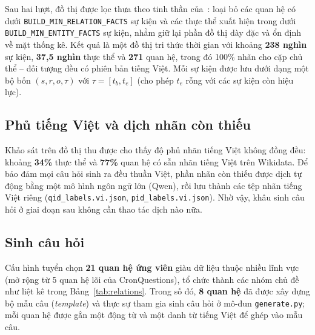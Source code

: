 Sau hai lượt, đồ thị được lọc thưa theo tinh thần của~\cite{lacroix2020tkbc}: loại bỏ các quan hệ
có dưới \texttt{BUILD\_MIN\_RELATION\_FACTS} sự kiện và các thực thể xuất hiện trong dưới
\texttt{BUILD\_MIN\_ENTITY\_FACTS} sự kiện, nhằm giữ lại phần đồ thị dày đặc và ổn định về mặt thống
kê. Kết quả là một đồ thị tri thức thời gian với khoảng \textbf{238 nghìn} sự kiện, \textbf{37,5
nghìn} thực thể và \textbf{271} quan hệ, trong đó 100\% nhãn cho cặp chủ thể -- đối tượng đều có
phiên bản tiếng Việt. Mỗi sự kiện được lưu dưới dạng một bộ bốn $(s, r, o, \tau)$ với
$\tau = [t_{b}, t_{e}]$ (cho phép $t_{e}$ rỗng với các sự kiện còn hiệu lực).

\subsection{Phủ tiếng Việt và dịch nhãn còn thiếu}
\label{sec:vicoverage}

Khảo sát trên đồ thị thu được cho thấy độ phủ nhãn tiếng Việt không đồng đều: khoảng \textbf{34\%}
thực thể và \textbf{77\%} quan hệ có sẵn nhãn tiếng Việt trên Wikidata. Để bảo đảm mọi câu hỏi sinh
ra đều thuần Việt, phần nhãn còn thiếu được dịch tự động bằng một mô hình ngôn ngữ lớn (Qwen), rồi
lưu thành các tệp nhãn tiếng Việt riêng (\texttt{qid\_labels.vi.json}, \texttt{pid\_labels.vi.json}).
Nhờ vậy, khâu sinh câu hỏi ở giai đoạn sau không cần thao tác dịch nào nữa.

\subsection{Sinh câu hỏi}
\label{sec:generate}

Cấu hình tuyển chọn \textbf{21 quan hệ ứng viên} giàu dữ liệu thuộc nhiều lĩnh vực (mở rộng từ 5
quan hệ lõi của CronQuestions), tổ chức thành các nhóm chủ đề như liệt kê trong
Bảng~\ref{tab:relations}. Trong số đó, \textbf{8 quan hệ} đã được xây dựng bộ mẫu câu
(\textit{template}) và thực sự tham gia sinh câu hỏi ở mô-đun \texttt{generate.py}; mỗi quan hệ
được gắn một động từ và một danh từ tiếng Việt để ghép vào mẫu câu.

